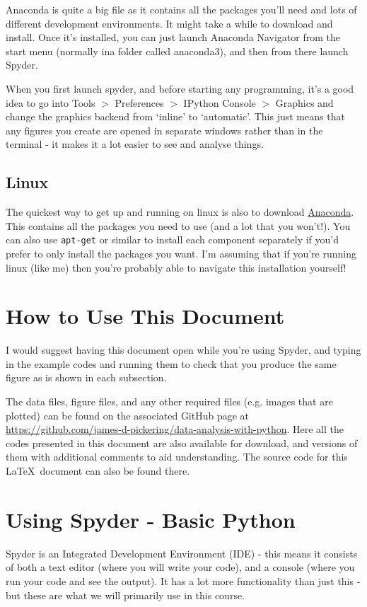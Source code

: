 \documentclass[10pt,a4paper]{memoir}
\begin{document}
Anaconda is quite a big file as it contains all the packages you'll need and lots of different development environments. It might take a while to download and install. Once it's installed, you can just launch Anaconda Navigator from the start menu (normally ina folder called anaconda3), and then from there launch Spyder.

When you first launch spyder, and before starting any programming, it's a good idea to go into Tools $>$ Preferences $>$ IPython Console $>$ Graphics and change the graphics backend from `inline' to `automatic'. This just means that any figures you create are opened in separate windows rather than in the terminal - it makes it a lot easier to see and analyse things.
\subsection{Linux}
The quickest way to get up and running on linux is also to download \href{https://www.anaconda.com/download/#linux}{Anaconda}. This contains all the packages you need to use (and a lot that you won't!). You can also use \texttt{apt-get} or similar to install each component separately if you'd prefer to only install the packages you want. I'm assuming that if you're running linux (like me) then you're probably able to navigate this installation yourself!  

\section*{How to Use This Document}
I would suggest having this document open while you're using Spyder, and typing in the example codes and running them to check that you produce the same figure as is shown in each subsection.

The data files, figure files, and any other required files (e.g. images that are plotted) can be found on the associated GitHub page at \url{https://github.com/james-d-pickering/data-analysis-with-python}. Here all the codes presented in this document are also available for download, and versions of them with additional comments to aid understanding. The source code for this \LaTeX~document can also be found there.


\newpage

\section{Using Spyder - Basic Python}
Spyder is an Integrated Development Environment (IDE) - this means it consists of both a text editor (where you will write your code), and a console (where you run your code and see the output). It has a lot more functionality than just this - but these are what we will primarily use in this course. 
\end{document}
